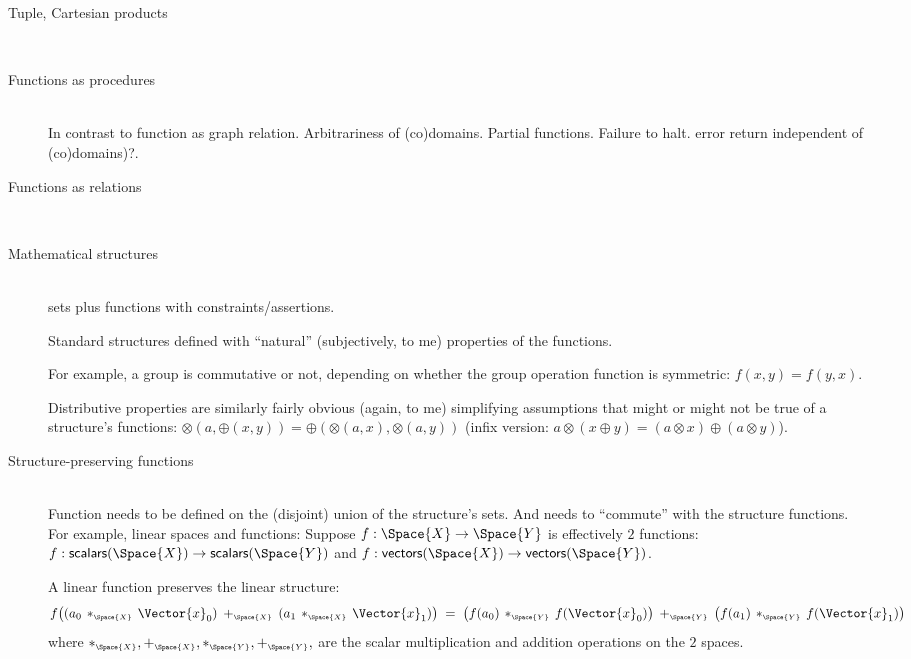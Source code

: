 \documentclass[11pt,openany]{article}
\begin{document}
\begin{description}
\item[Tuple, Cartesian products]\mbox{}\\

\item[Functions as procedures]\mbox{}\\
In contrast to function as graph relation.
Arbitrariness of (co)domains. Partial functions. Failure to halt.
error return independent of (co)domains)?.

\item[Functions as relations]\mbox{}\\

\item[Mathematical structures]\mbox{}\\
sets plus functions with constraints/assertions.
\par
Standard structures defined with ``natural'' (subjectively, to me)
properties of the functions. 
\par
For example, a group is commutative or not, depending on whether
the group operation function is symmetric: $f(x,y) = f(y,x)$.
\par
Distributive properties are similarly fairly obvious (again, to me)
simplifying assumptions that might or might not be true of
a structure's functions: 
$\otimes (a,\oplus (x,y)) = \oplus (\otimes (a,x), \otimes (a,y))$
(infix version: 
$a \otimes (x \oplus y) = (a \otimes x) \oplus (a \otimes y)$).

\item[Structure-preserving functions]\mbox{}\\
Function needs to be defined on the (disjoint) union of the 
structure's sets.
And needs to ``commute'' with the structure functions.
For example, linear spaces and functions: 
Suppose $f : \Space{X} \rightarrow \Space{Y}$
is effectively $2$ functions:
$f : \mathsf{scalars}(\Space{X}) \rightarrow \mathsf{scalars}(\Space{Y})$ and
$f : \mathsf{vectors}(\Space{X}) \rightarrow \mathsf{vectors}(\Space{Y})$.
 
A linear function preserves the linear structure:
\begin{equation}
f \big( (a_0 \, *_{\scriptscriptstyle\Space{X}} \, \Vector{x}_0) 
\: +_{\scriptscriptstyle\Space{X}} \: 
(a_1 \, *_{\scriptscriptstyle\Space{X}} \, \Vector{x}_1) \big)
\; = \; 
\big( f(a_0) \, *_{\scriptscriptstyle\Space{Y}} \, f(\Vector{x}_0) \big) 
\: +_{\scriptscriptstyle\Space{Y}} \: 
\big( f(a_1) \, *_{\scriptscriptstyle\Space{Y}} \, f(\Vector{x}_1) \big)
\end{equation}
where $*_{\scriptscriptstyle\Space{X}}, +_{\scriptscriptstyle\Space{X}}, 
*_{\scriptscriptstyle\Space{Y}}, +_{\scriptscriptstyle\Space{Y}},$
are the scalar multiplication and addition operations on the $2$ spaces.
\end{description}
\end{document}
